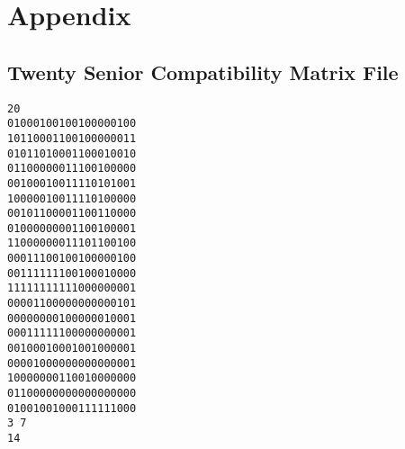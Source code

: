 \documentclass[a4paper]{article}
\begin{document}
\section{Appendix}
\subsection{Twenty Senior Compatibility Matrix File}
\begin{verbatim}
20
01000100100100000100
10110001100100000011
01011010001100010010
01100000011100100000
00100010011110101001
10000010011110100000
00101100001100110000
01000000001100100001
11000000011101100100
00011100100100000100
00111111100100010000
11111111111000000001
00001100000000000101
00000000100000010001
00011111100000000001
00100010001001000001
00001000000000000001
10000000110010000000
01100000000000000000
01001001000111111000
3 7
14
\end{verbatim}
\end{document}
